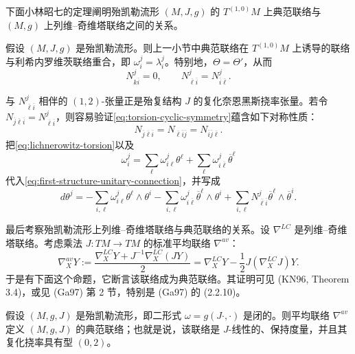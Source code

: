 下面小林昭七的定理阐明殆凯勒流形 $(M,J,g)$ 的 $T^{(1,0)}M$ 上典范联络与 $(M,g)$ 上列维--奇维塔联络之间的关系。

\begin{theorem}[小林昭七]\label{thm:canonical-equals-lichnerowitz}
假设 $(M,J,g)$ 是殆凯勒流形。则上一小节中典范联络在 $T^{(1,0)}M$ 上诱导的联络与利希内罗维茨联络重合，即 $\omega_i^j=\lambda_i^j$。特别地，$\Theta=\Theta'$，从而
\[
 N_{k\overline i}^{j}=0,
 \qquad N_{\overline\ell\overline i}^{j}
 =N_{\overline i\overline\ell}^{j}.
\]
\end{theorem}

与 $N_{\overline\ell\overline i}^{j}$ 相伴的 $(1,2)$-张量正是殆复结构 $J$ 的复化奈恩黑斯挠率张量。若令
$N_{\overline j\overline\ell\overline i}=N_{\overline\ell\overline i}^{j}$，则容易验证\eqref{eq:torsion-cyclic-symmetry}蕴含如下对称性质：
\begin{equation}
 N_{\overline j\overline\ell\overline i}
 =N_{\overline\ell\overline i\overline j}
 =N_{\overline i\overline j\overline\ell}.
 \label{eq:nijenhuis-cyclic-symmetry}
\end{equation}
把\eqref{eq:lichnerowitz-torsion}以及
\[
 \omega_i^j=\sum_\ell\omega_{i\ell}^j\theta^\ell
 +\sum_\ell\omega_{i\overline\ell}^j\overline\theta^\ell
\]
代入\eqref{eq:first-structure-unitary-connection}，并写成
\[
 d\theta^j=-\sum_{i,\ell}\omega_{i\ell}^j\theta^\ell\wedge\theta^i
 -\sum_{i,\ell}\omega_{i\overline\ell}^j\overline\theta^\ell\wedge\theta^i
 +\sum_{i,\ell}N_{\overline\ell\overline i}^{j}
 \overline\theta^\ell\wedge\overline\theta^i.
\]

最后考察殆凯勒流形上列维--奇维塔联络与典范联络的关系。设 $\nabla^{LC}$ 是列维--奇维塔联络。考虑乘法 $J:TM\to TM$ 的标准平均联络 $\nabla^{av}$：
\begin{equation}
 \nabla_X^{av}Y:=
 \frac{\nabla_X^{LC}Y+J^{-1}\nabla_X^{LC}(JY)}2
 =\nabla_X^{LC}Y-\frac12J(\nabla_X^{LC}J)Y.
 \label{eq:averaged-connection}
\end{equation}
于是有下面这个命题，它断言该联络成为典范联络。其证明可见 (KN96, Theorem 3.4)，或见 (Ga97) 第 2 节，特别是 (Ga97) 的 (2.2.10)。

\begin{theorem}\label{thm:averaged-connection-canonical}
假设 $(M,g,J)$ 是殆凯勒流形，即二形式 $\omega=g(J\cdot,\cdot)$ 是闭的。则平均联络 $\nabla^{av}$ 定义 $(M,g,J)$ 的典范联络；也就是说，该联络是 $J$-线性的、保持度量，并且其复化挠率具有型 $(0,2)$。
\end{theorem}


